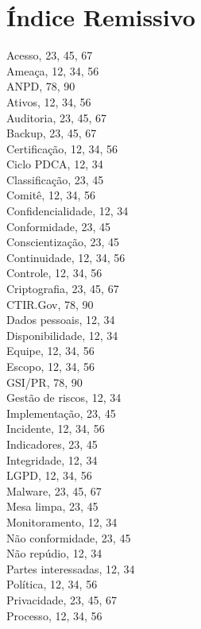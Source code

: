 \documentclass[12pt,a4paper]{report}
\begin{document}
\section{Índice Remissivo}

\begin{multicols}{3}
Acesso, 23, 45, 67\\
Ameaça, 12, 34, 56\\
ANPD, 78, 90\\
Ativos, 12, 34, 56\\
Auditoria, 23, 45, 67\\
Backup, 23, 45, 67\\
Certificação, 12, 34, 56\\
Ciclo PDCA, 12, 34\\
Classificação, 23, 45\\
Comitê, 12, 34, 56\\
Confidencialidade, 12, 34\\
Conformidade, 23, 45\\
Conscientização, 23, 45\\
Continuidade, 12, 34, 56\\
Controle, 12, 34, 56\\
Criptografia, 23, 45, 67\\
CTIR.Gov, 78, 90\\
Dados pessoais, 12, 34\\
Disponibilidade, 12, 34\\
Equipe, 12, 34, 56\\
Escopo, 12, 34, 56\\
GSI/PR, 78, 90\\
Gestão de riscos, 12, 34\\
Implementação, 23, 45\\
Incidente, 12, 34, 56\\
Indicadores, 23, 45\\
Integridade, 12, 34\\
LGPD, 12, 34, 56\\
Malware, 23, 45, 67\\
Mesa limpa, 23, 45\\
Monitoramento, 12, 34\\
Não conformidade, 23, 45\\
Não repúdio, 12, 34\\
Partes interessadas, 12, 34\\
Política, 12, 34, 56\\
Privacidade, 23, 45, 67\\
Processo, 12, 34, 56\\

\end{multicols}
\end{document}
